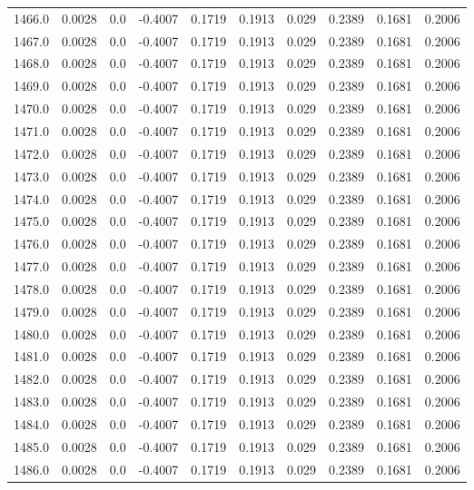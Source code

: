 \begin{longtable}{lrrrrrrrrr}
1466.0 & 0.0028 & 0.0 & -0.4007 & 0.1719 & 0.1913 & 0.029 & 0.2389 & 0.1681 & 0.2006 \\
1467.0 & 0.0028 & 0.0 & -0.4007 & 0.1719 & 0.1913 & 0.029 & 0.2389 & 0.1681 & 0.2006 \\
1468.0 & 0.0028 & 0.0 & -0.4007 & 0.1719 & 0.1913 & 0.029 & 0.2389 & 0.1681 & 0.2006 \\
1469.0 & 0.0028 & 0.0 & -0.4007 & 0.1719 & 0.1913 & 0.029 & 0.2389 & 0.1681 & 0.2006 \\
1470.0 & 0.0028 & 0.0 & -0.4007 & 0.1719 & 0.1913 & 0.029 & 0.2389 & 0.1681 & 0.2006 \\
1471.0 & 0.0028 & 0.0 & -0.4007 & 0.1719 & 0.1913 & 0.029 & 0.2389 & 0.1681 & 0.2006 \\
1472.0 & 0.0028 & 0.0 & -0.4007 & 0.1719 & 0.1913 & 0.029 & 0.2389 & 0.1681 & 0.2006 \\
1473.0 & 0.0028 & 0.0 & -0.4007 & 0.1719 & 0.1913 & 0.029 & 0.2389 & 0.1681 & 0.2006 \\
1474.0 & 0.0028 & 0.0 & -0.4007 & 0.1719 & 0.1913 & 0.029 & 0.2389 & 0.1681 & 0.2006 \\
1475.0 & 0.0028 & 0.0 & -0.4007 & 0.1719 & 0.1913 & 0.029 & 0.2389 & 0.1681 & 0.2006 \\
1476.0 & 0.0028 & 0.0 & -0.4007 & 0.1719 & 0.1913 & 0.029 & 0.2389 & 0.1681 & 0.2006 \\
1477.0 & 0.0028 & 0.0 & -0.4007 & 0.1719 & 0.1913 & 0.029 & 0.2389 & 0.1681 & 0.2006 \\
1478.0 & 0.0028 & 0.0 & -0.4007 & 0.1719 & 0.1913 & 0.029 & 0.2389 & 0.1681 & 0.2006 \\
1479.0 & 0.0028 & 0.0 & -0.4007 & 0.1719 & 0.1913 & 0.029 & 0.2389 & 0.1681 & 0.2006 \\
1480.0 & 0.0028 & 0.0 & -0.4007 & 0.1719 & 0.1913 & 0.029 & 0.2389 & 0.1681 & 0.2006 \\
1481.0 & 0.0028 & 0.0 & -0.4007 & 0.1719 & 0.1913 & 0.029 & 0.2389 & 0.1681 & 0.2006 \\
1482.0 & 0.0028 & 0.0 & -0.4007 & 0.1719 & 0.1913 & 0.029 & 0.2389 & 0.1681 & 0.2006 \\
1483.0 & 0.0028 & 0.0 & -0.4007 & 0.1719 & 0.1913 & 0.029 & 0.2389 & 0.1681 & 0.2006 \\
1484.0 & 0.0028 & 0.0 & -0.4007 & 0.1719 & 0.1913 & 0.029 & 0.2389 & 0.1681 & 0.2006 \\
1485.0 & 0.0028 & 0.0 & -0.4007 & 0.1719 & 0.1913 & 0.029 & 0.2389 & 0.1681 & 0.2006 \\
1486.0 & 0.0028 & 0.0 & -0.4007 & 0.1719 & 0.1913 & 0.029 & 0.2389 & 0.1681 & 0.2006 \\

\end{longtable}
